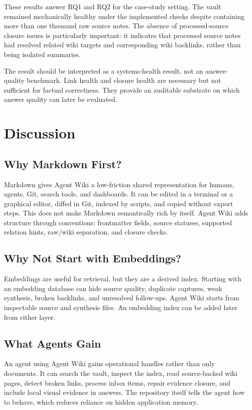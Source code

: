 \documentclass[11pt]{article}
\begin{document}
These results answer RQ1 and RQ2 for the case-study setting. The vault remained
mechanically healthy under the implemented checks despite containing more than
one thousand raw source notes. The absence of processed-source closure issues is
particularly important: it indicates that processed source notes had resolved
related wiki targets and corresponding wiki backlinks, rather than being
isolated summaries.

The result should be interpreted as a systems-health result, not an answer-
quality benchmark. Link health and closure health are necessary but not
sufficient for factual correctness. They provide an auditable substrate on which
answer quality can later be evaluated.

\section{Discussion}

\subsection{Why Markdown First?}

Markdown gives Agent Wiki a low-friction shared representation for humans,
agents, Git, search tools, and dashboards. It can be edited in a terminal or a
graphical editor, diffed in Git, indexed by scripts, and copied without export
steps. This does not make Markdown semantically rich by itself. Agent Wiki adds
structure through conventions: frontmatter fields, source statuses, supported
relation hints, raw/wiki separation, and closure checks.

\subsection{Why Not Start with Embeddings?}

Embeddings are useful for retrieval, but they are a derived index. Starting with
an embedding database can hide source quality, duplicate captures, weak
synthesis, broken backlinks, and unresolved follow-ups. Agent Wiki starts from
inspectable source and synthesis files. An embedding index can be added later
from either layer.

\subsection{What Agents Gain}

An agent using Agent Wiki gains operational handles rather than only documents.
It can search the vault, inspect the index, read source-backed wiki pages,
detect broken links, process inbox items, repair evidence closure, and include
local visual evidence in answers. The repository itself tells the agent how to
behave, which reduces reliance on hidden application memory.
\end{document}
